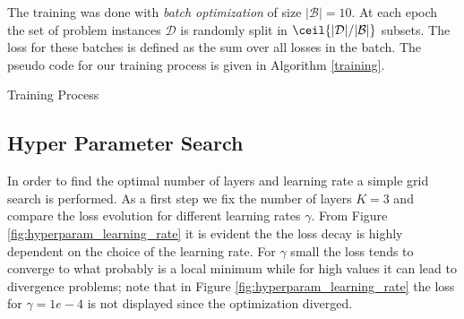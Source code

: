 \documentclass{article} %
\begin{document}
The training was done with \textit{batch optimization} of size $|\mathcal{B}|=10$.
At each epoch the set of problem instances $\mathcal{D}$ is randomly split in $\ceil{|\mathcal{D}|/|\mathcal{B}|}$ subsets.
The loss for these batches is defined as the sum over all losses in the batch. The pseudo code for our training process is given in Algorithm \ref{training}.

\begin{algorithm}[h]
    \Data{$\underline{\mG}$,$\underline{\vb}$,$\underline{\vf}$}
    \BlankLine
 \label{training}
 \caption{Training Process}
\end{algorithm}

\subsection{Hyper Parameter Search}
In order to find the optimal number of layers and learning rate a simple grid search is performed.
As a first step we fix the number of layers $K=3$ and compare the loss evolution for different learning rates $\gamma$.
From Figure \ref{fig:hyperparam_learning_rate} it is evident the the loss decay is highly dependent on the choice of the learning rate. For $\gamma$ small the loss tends to converge to what probably is a local minimum while for high values it can lead to divergence problems; note that in Figure \ref{fig:hyperparam_learning_rate} the loss for $\gamma=1e-4$ is not displayed since the optimization diverged. 
\end{document}
